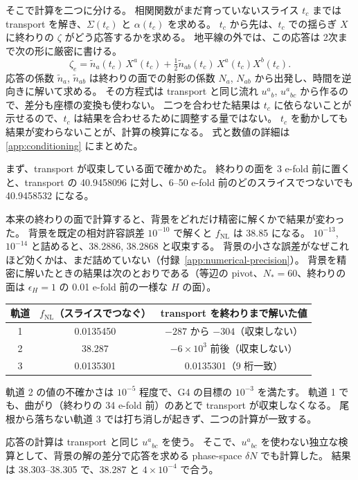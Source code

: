 \documentclass[a4paper,11pt]{ltjsarticle}
\newcommand{\fnl}{f_{\mathrm{NL}}}
\begin{document}
そこで計算を二つに分ける。
相関関数がまだ育っていないスライス $t_c$ までは transport を解き、$\Sigma(t_c)$ と $\alpha(t_c)$ を求める。
$t_c$ から先は、$t_c$ での揺らぎ $X$ に終わりの $\zeta$ がどう応答するかを求める。
地平線の外では、この応答は 2次まで次の形に厳密に書ける。
\[
\zeta_e=\tilde n_a(t_c)\,X^a(t_c)+\tfrac12\tilde n_{ab}(t_c)\,X^a(t_c)X^b(t_c) .
\]
応答の係数 $\tilde n_a$, $\tilde n_{ab}$ は終わりの面での射影の係数 $N_a$, $N_{ab}$ から出発し、時間を逆向きに解いて求める。
その方程式は transport と同じ流れ $u^a{}_b$, $u^a{}_{bc}$ から作るので、差分も座標の変換も使わない。
二つを合わせた結果は $t_c$ に依らないことが示せるので、$t_c$ は結果を合わせるために調整する量ではない。
$t_c$ を動かしても結果が変わらないことが、計算の検算になる。
式と数値の詳細は\ref{app:conditioning} にまとめた。

まず、transport が収束している面で確かめた。
終わりの面を 3 e-fold 前に置くと、transport の 40.9458096 に対し、6--50 e-fold 前のどのスライスでつないでも 40.9458532 になる。

本来の終わりの面で計算すると、背景をどれだけ精密に解くかで結果が変わった。
背景を既定の相対許容誤差 $10^{-10}$ で解くと $\fnl$ は 38.85 になる。
$10^{-13}$, $10^{-14}$ と詰めると、38.2886, 38.2868 と収束する。
背景の小さな誤差がなぜこれほど効くかは、まだ詰めていない（付録~\ref{app:numerical-precision}）。
背景を精密に解いたときの結果は次のとおりである（等辺の pivot、$N_*=60$、終わりの面は $\epsilon_H=1$ の 0.01 e-fold 前の一様な $H$ の面）。
\begin{center}
\begin{tabular}{ccc}
\toprule
軌道 & $\fnl$（スライスでつなぐ） & transport を終わりまで解いた値 \\
\midrule
1 & 0.0135450 & $-287$ から $-304$（収束しない） \\
2 & 38.287 & $-6\times10^3$ 前後（収束しない） \\
3 & 0.0135301 & 0.0135301（9 桁一致） \\
\bottomrule
\end{tabular}
\end{center}
軌道 2 の値の不確かさは $10^{-5}$ 程度で、G4 の目標の $10^{-3}$ を満たす。
軌道 1 でも、曲がり（終わりの 34 e-fold 前）のあとで transport が収束しなくなる。
尾根から落ちない軌道 3 では打ち消しが起きず、二つの計算が一致する。

応答の計算は transport と同じ $u^a{}_{bc}$ を使う。
そこで、$u^a{}_{bc}$ を使わない独立な検算として、背景の解の差分で応答を求める phase-space $\delta N$ でも計算した。
結果は 38.303--38.305 で、38.287 と $4\times10^{-4}$ で合う。
\end{document}
